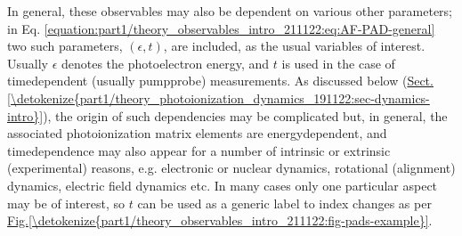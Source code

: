 \documentclass[letterpaper,table,10pt,english]{jupyterBook}
\begin{document}
\sphinxAtStartPar
In general, these observables may also be dependent on various other parameters; in Eq. \eqref{equation:part1/theory_observables_intro_211122:eq:AF-PAD-general} two such parameters, \((\epsilon,t)\), are included, as the usual variables of interest. Usually \(\epsilon\) denotes the photoelectron energy, and \(t\) is used in the case of time\sphinxhyphen{}dependent (usually pump\sphinxhyphen{}probe) measurements. As discussed below (\hyperref[\detokenize{part1/theory_photoionization_dynamics_191122:sec-dynamics-intro}]{Sect.\@ \ref{\detokenize{part1/theory_photoionization_dynamics_191122:sec-dynamics-intro}}}), the origin of such dependencies may be complicated but, in general, the associated photoionization matrix elements are energy\sphinxhyphen{}dependent, and time\sphinxhyphen{}dependence may also appear for a number of intrinsic or extrinsic (experimental) reasons, e.g. electronic or nuclear dynamics, rotational (alignment) dynamics, electric field dynamics etc. In many cases only one particular aspect may be of interest, so \(t\) can be used as a generic label to index changes as per \hyperref[\detokenize{part1/theory_observables_intro_211122:fig-pads-example}]{Fig.\@ \ref{\detokenize{part1/theory_observables_intro_211122:fig-pads-example}}}.
\end{document}

